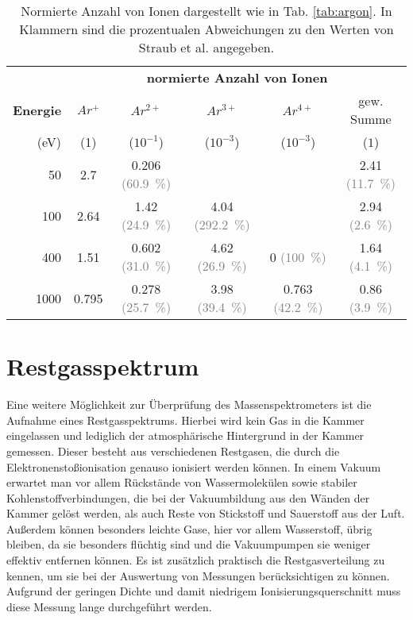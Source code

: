 \begin{table}
    \centering
    \caption[Normierte Anzahl von Ionen und Abweichung zu Werten von Straub et al.]{Normierte Anzahl von Ionen dargestellt wie in Tab. \ref{tab:argon}. In Klammern sind die prozentualen Abweichungen zu den Werten von Straub et al. \cite{Straub} angegeben.}
    \label{tab:vergleich}
    \begin{tabular}{r c c c c c}
        \toprule
        \text{} & \multicolumn{5}{c}{\textbf{normierte Anzahl von Ionen}} \\ 

        \textbf{Energie} & $Ar^+$ & $Ar^{2+}$ & $Ar^{3+}$ & $Ar^{4+}$ & gew. Summe \\
        (eV) & (1) & ($10^{-1}$) & ($10^{-3}$) & ($10^{-3}$) & ($1$) \\
        \midrule
        50  & {2.7}  & {0.206} \textcolor{gray}{(60.9\ \%)} & {}  & {}  & {2.41} \textcolor{gray}{(11.7\ \%)}   \\
        100 & 2.64  & 1.42 \textcolor{gray}{(24.9\ \%)} & 4.04 \textcolor{gray}{(292.2\ \%)} & {} & 2.94 \textcolor{gray}{(2.6\ \%)} \\
        400 & 1.51  & 0.602 \textcolor{gray}{(31.0\ \%)} & 4.62 \textcolor{gray}{(26.9\ \%)} & 0 \textcolor{gray}{(100\ \%)} & 1.64 \textcolor{gray}{(4.1\ \%)} \\
        1000 & 0.795  & 0.278 \textcolor{gray}{(25.7\ \%)} & 3.98 \textcolor{gray}{(39.4\ \%)} & 0.763 \textcolor{gray}{(42.2\ \%)} & 0.86 \textcolor{gray}{(3.9\ \%)} \\
               
        
        \bottomrule
    \end{tabular}
\end{table}

\section{Restgasspektrum}
Eine weitere Möglichkeit zur Überprüfung des Massenspektrometers ist die Aufnahme eines Restgasspektrums. Hierbei wird kein Gas in die Kammer eingelassen und lediglich der atmosphärische Hintergrund in der Kammer gemessen. Dieser besteht aus verschiedenen Restgasen, die durch die Elektronenstoßionisation genauso ionisiert werden können. In einem Vakuum erwartet man vor allem Rückstände von Wassermolekülen sowie stabiler Kohlenstoffverbindungen, die bei der Vakuumbildung aus den Wänden der Kammer gelöst werden, als auch Reste von Stickstoff und Sauerstoff aus der Luft. Außerdem können besonders leichte Gase, hier vor allem Wasserstoff, übrig bleiben, da sie besonders flüchtig sind und die Vakuumpumpen sie weniger effektiv entfernen können. Es ist zusätzlich praktisch die Restgasverteilung zu kennen, um sie bei der Auswertung von Messungen berücksichtigen zu können. Aufgrund der geringen Dichte und damit niedrigem Ionisierungsquerschnitt muss diese Messung lange durchgeführt werden. 

